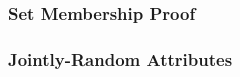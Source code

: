 \subsubsection{Set Membership Proof} \notimplemented

% 
% 

\subsubsection{Jointly-Random Attributes} \notimplemented

